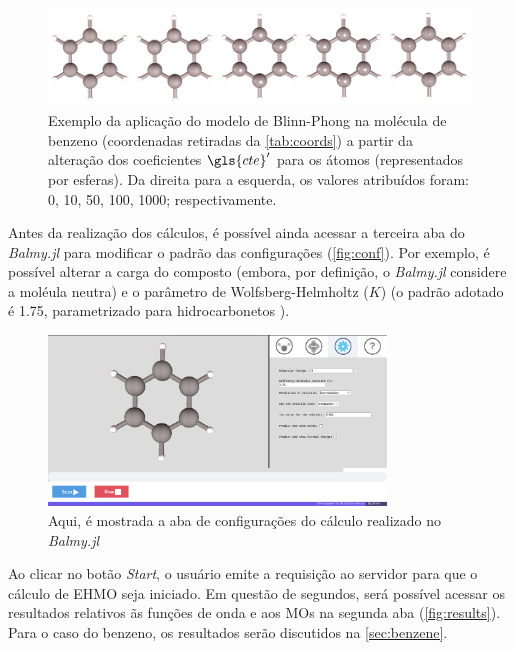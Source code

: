 
\begin{figure}[htb]
\caption{\label{fig:representations} Exemplo da aplicação do modelo de Blinn-Phong na molécula de benzeno (coordenadas retiradas da \autoref{tab:coords}) a partir da alteração dos coeficientes $\gls{cte}'$ para os átomos (representados por esferas). Da direita para a esquerda, os valores atribuídos foram: 0, 10, 50, 100, 1000; respectivamente.}
	\begin{center}
		\includegraphics[width=1.0\textwidth]{images/shininess(1).png}
	\end{center}
\end{figure}

Antes da realização dos cálculos, é possível ainda acessar a terceira aba do \textit{Balmy.jl} para modificar o padrão das configurações (\autoref{fig:conf}). Por exemplo, é possível alterar a carga do composto (embora, por definição, o \textit{Balmy.jl} considere a moléula neutra) e o parâmetro de Wolfsberg-Helmholtz ($K$) (o padrão adotado é 1.75, parametrizado para hidrocarbonetos \autocite{Hoffmann1963}).

\begin{figure}[htb]
	\caption{\label{fig:conf} Aqui, é mostrada a aba de configurações do cálculo realizado no \textit{Balmy.jl}}
	\begin{center}
		\includegraphics[width=0.8\textwidth]{images/conf.png}
	\end{center}
\end{figure}


Ao clicar no botão \textit{Start}, o usuário emite a requisição ao servidor para que o cálculo de \gls{EHMO} seja iniciado. Em questão de segundos, será possível acessar os resultados relativos ãs funções de onda e aos \gls{MOs} na segunda aba (\autoref{fig:results}). Para o caso do benzeno, os resultados serão discutidos na \autoref{sec:benzene}.

